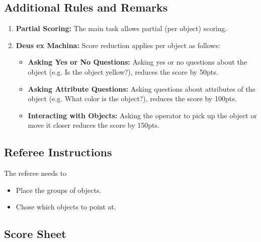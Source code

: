 \subsection*{Additional Rules and Remarks}
\begin{enumerate}[nosep]
	\item \textbf{Partial Scoring:} The main task allows partial (per object) scoring.
	
	\item \textbf{Deus ex Machina:} Score reduction applies per object as follows:
	\begin{itemize}[nosep]
		\item \textbf{Asking Yes or No Questions:} Asking yes or no questions about the object (e.g. Is the object yellow?), reduces the score by 50pts.
		\item \textbf{Asking Attribute Questions:} Asking questions about attributes of the object (e.g. What color is the object?), reduces the score by 100pts.
		\item \textbf{Interacting with Objects:} Asking the operator to pick up the object or move it closer reduces the score by 150pts.
	\end{itemize}
\end{enumerate}

\newpage

\subsection*{Referee Instructions}

The referee needs to
\begin{itemize}[nosep]
	\item Place the groups of objects.
	\item Chose which objects to point at.
\end{itemize}

\subsection*{Score Sheet}



